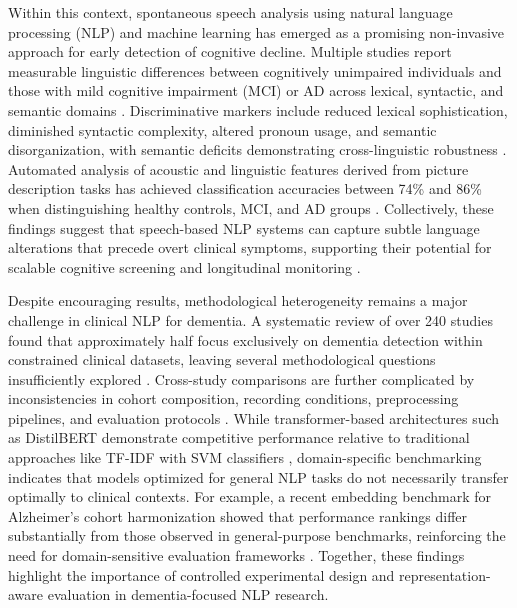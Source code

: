 \documentclass[final,5p,times]{elsarticle}
\begin{document}
Within this context, spontaneous speech analysis using natural language processing (NLP) and machine learning has emerged as a promising non-invasive approach for early detection of cognitive decline. Multiple studies report measurable linguistic differences between cognitively unimpaired individuals and those with mild cognitive impairment (MCI) or AD across lexical, syntactic, and semantic domains \cite{Beltrami2018,Lindsay2021,Nyongesa2025,Gosztolya2019}. Discriminative markers include reduced lexical sophistication, diminished syntactic complexity, altered pronoun usage, and semantic disorganization, with semantic deficits demonstrating cross-linguistic robustness \cite{Lindsay2021,Nyongesa2025}. Automated analysis of acoustic and linguistic features derived from picture description tasks has achieved classification accuracies between 74\% and 86\% when distinguishing healthy controls, MCI, and AD groups \cite{Gosztolya2019}. Collectively, these findings suggest that speech-based NLP systems can capture subtle language alterations that precede overt clinical symptoms, supporting their potential for scalable cognitive screening and longitudinal monitoring \cite{Nyongesa2025}.

Despite encouraging results, methodological heterogeneity remains a major challenge in clinical NLP for dementia. A systematic review of over 240 studies found that approximately half focus exclusively on dementia detection within constrained clinical datasets, leaving several methodological questions insufficiently explored \cite{PeledCohenReichart2025}. Cross-study comparisons are further complicated by inconsistencies in cohort composition, recording conditions, preprocessing pipelines, and evaluation protocols \cite{delaFuenteGarcia2020}. While transformer-based architectures such as DistilBERT demonstrate competitive performance relative to traditional approaches like TF-IDF with SVM classifiers \cite{Searle2020}, domain-specific benchmarking indicates that models optimized for general NLP tasks do not necessarily transfer optimally to clinical contexts. For example, a recent embedding benchmark for Alzheimer's cohort harmonization showed that performance rankings differ substantially from those observed in general-purpose benchmarks, reinforcing the need for domain-sensitive evaluation frameworks \cite{Adams2026}. Together, these findings highlight the importance of controlled experimental design and representation-aware evaluation in dementia-focused NLP research.
\end{document}
